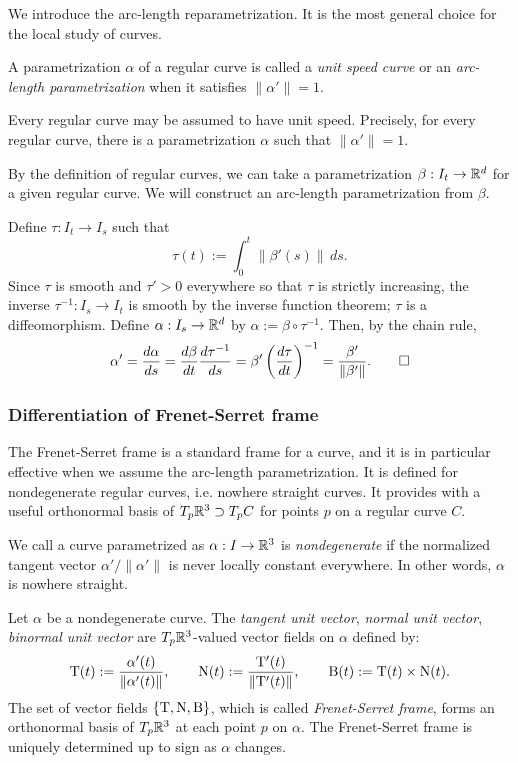 \documentclass{../exp}
\def\a{\alpha}
\begin{document}
We introduce the arc-length reparametrization.
It is the most general choice for the local study of curves.
\begin{defn}
A parametrization $\a$ of a regular curve is called a \emph{unit speed curve} or an \emph{arc-length parametrization} when it satisfies $\|\a'\|=1$.
\end{defn}
\begin{thm}
Every regular curve may be assumed to have unit speed.
Precisely, for every regular curve, there is a parametrization $\a$ such that $\|\a'\|=1$.
\end{thm}
\begin{pf}
By the definition of regular curves, we can take a parametrization $\beta:I_t\to\R^d$ for a given regular curve.
We will construct an arc-length parametrization from $\beta$.

Define $\tau:I_t\to I_s$ such that
\[\tau(t):=\int_0^t\|\beta'(s)\|\,ds.\]
Since $\tau$ is smooth and $\tau'>0$ everywhere so that $\tau$ is strictly increasing, the inverse $\tau^{-1}:I_s\to I_t$ is smooth by the inverse function theorem; $\tau$ is a diffeomorphism.
Define $\a:I_s\to\R^d$ by $\a:=\beta\circ\tau^{-1}$.
Then, by the chain rule,
\[\a'=\dd{\a}{s}=\dd{\beta}{t}\dd{\tau^{-1}}{s}=\beta'\left(\dd{\tau}{t}\right)^{-1}=\frac{\beta'}{\|\beta'\|}.\qedhere\]
\end{pf}




\subsubsection{Differentiation of Frenet-Serret frame}

The Frenet-Serret frame is a standard frame for a curve, and it is in particular effective when we assume the arc-length parametrization.
It is defined for nondegenerate regular curves, i.e. nowhere straight curves.
It provides with a useful orthonormal basis of $T_p\mathbb{R}^3\supset T_pC$ for points $p$ on a regular curve $C$.
\begin{defn}
We call a curve parametrized as $\a:I\to\R^3$ is \emph{nondegenerate} if the normalized tangent vector $\a'/\|\a'\|$ is never locally constant everywhere.
In other words, $\a$ is nowhere straight.
\end{defn}

\begin{defn}
Let $\a$ be a nondegenerate curve.
The \emph{tangent unit vector}, \emph{normal unit vector}, \emph{binormal unit vector} are $T_p\mathbb{R}^3$-valued vector fields on $\a$ defined by:
\[\rT(t):=\frac{\a'(t)}{\|\a'(t)\|},\qquad\rN(t):=\frac{\rT'(t)}{\|\rT'(t)\|},\qquad\rB(t):=\rT(t)\times\rN(t).\]
The set of vector fields $\{\mathrm{T},\mathrm{N},\mathrm{B}\}$, which is called \emph{Frenet-Serret frame}, forms an orthonormal basis of $T_p\mathbb{R}^3$ at each point $p$ on $\a$.
The Frenet-Serret frame is uniquely determined up to sign as $\a$ changes.
\end{defn}
\end{document}
